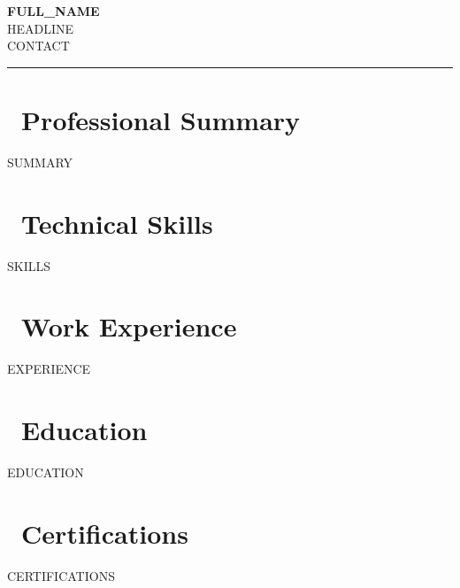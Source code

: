 \documentclass[10pt, letterpaper]{article}
\begin{document}
\begin{center}
  {\fontsize{24}{28}\bfseries\color{accentdark} \MakeUppercase{{{FULL_NAME}}}}\\[4pt]
  {\fontsize{11}{13}\color{textmuted} {{HEADLINE}}}\\[6pt]
{{CONTACT}}
\end{center}
\vspace{-2pt}
\textcolor{accent}{\rule{\linewidth}{1pt}}

\section{\faUser\ Professional Summary}
{\fontsize{9}{13}\color{textmain}
{{SUMMARY}}}

\section{\faCogs\ Technical Skills}
\vspace{2pt}
{{SKILLS}}
\vspace{4pt}

\section{\faBriefcase\ Work Experience}

{{EXPERIENCE}}

\vspace{3pt}
\section{\faGraduationCap\ Education}
{{EDUCATION}}

\vspace{3pt}
\section{\faCertificate\ Certifications}
{{CERTIFICATIONS}}
\end{document}
